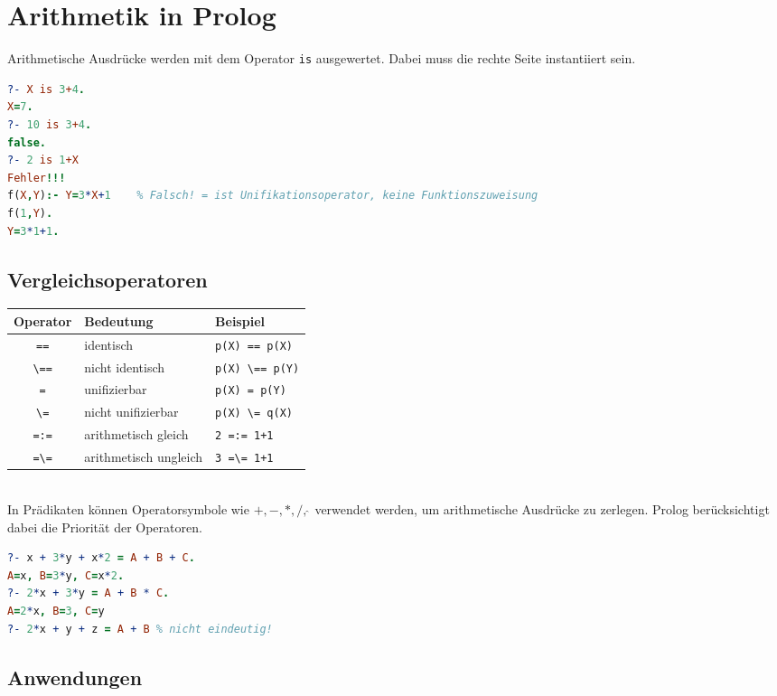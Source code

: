 \section{Arithmetik in Prolog}
Arithmetische Ausdrücke werden mit dem Operator \lstinline$is$ ausgewertet. Dabei muss die rechte Seite instantiiert sein.
$ $
\begin{lstlisting}[language=Prolog]
?- X is 3+4.
X=7.
?- 10 is 3+4.
false.
?- 2 is 1+X
Fehler!!!
f(X,Y):- Y=3*X+1	% Falsch! = ist Unifikationsoperator, keine Funktionszuweisung
f(1,Y).
Y=3*1+1.
\end{lstlisting}

\subsection{Vergleichsoperatoren}
\begin{tabular}{c l l}
Operator & Bedeutung & Beispiel\\\hline
\lstinline$==$ & identisch & \lstinline$p(X) == p(X)$\\
\lstinline$\==$ & nicht identisch & \lstinline$p(X) \== p(Y)$\\
\lstinline$=$ & unifizierbar & \lstinline$p(X) = p(Y)$\\
\lstinline$\=$ & nicht unifizierbar & \lstinline$p(X) \= q(X)$\\
\lstinline$=:=$ & arithmetisch gleich & \lstinline$2 =:= 1+1$\\
\lstinline$=\=$ & arithmetisch ungleich & \lstinline$3 =\= 1+1$
\end{tabular}\\
In Prädikaten können Operatorsymbole wie $+, -, *, /, \hat{\,}$ verwendet werden, um arithmetische Ausdrücke zu zerlegen. Prolog berücksichtigt dabei die Priorität der Operatoren.
$ $
\begin{lstlisting}[language=Prolog]
?- x + 3*y + x*2 = A + B + C.
A=x, B=3*y, C=x*2.
?- 2*x + 3*y = A + B * C.
A=2*x, B=3, C=y
?- 2*x + y + z = A + B % nicht eindeutig!
\end{lstlisting}

\subsection{Anwendungen}
